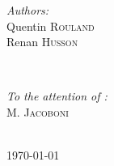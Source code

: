 \documentclass[12pt]{article}
\begin{document}
\begin{minipage}{0.4\textwidth}
\begin{flushleft} \large
\emph{Authors:}\\
Quentin \textsc{Rouland}\\
Renan \textsc{Husson}
\end{flushleft}
\end{minipage}
~
\begin{minipage}{0.4\textwidth}
\begin{flushright} \large
\emph{To the attention of :} \\
 M.  \textsc{Jacoboni }
\end{flushright}
\end{minipage}\\[4cm]



{\large \today}\\[3cm] %




\clearpage
\tableofcontents
\clearpage
\end{document}
